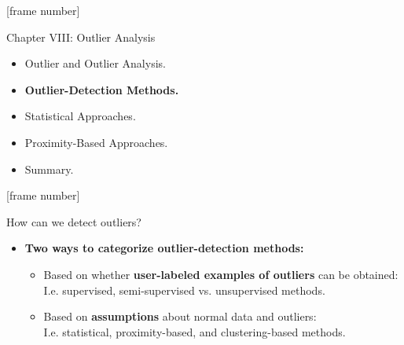 \documentclass[aspectratio=169,t,xcolor=dvipsnames]{beamer}
\begin{document}
{
[frame number]
\begin{frame}{Chapter VIII: Outlier Analysis}
    \begin{itemize}
        \item Outlier and Outlier Analysis.
        \item \textbf{Outlier-Detection Methods.}
        \item Statistical Approaches.
        \item Proximity-Based Approaches.
        \item Summary.
    \end{itemize}
\end{frame}
}

{
[frame number]
\begin{frame}{How can we detect outliers?}
    \begin{itemize}
        \item \textbf{Two ways to categorize outlier-detection methods:}
        \begin{itemize}
            \item Based on whether \textbf{\color{airforceblue}user-labeled examples of outliers} can be obtained: \\
            I.e. supervised, semi-supervised vs. unsupervised methods.
            \item Based on \textbf{\color{airforceblue}assumptions} about normal data and outliers: \\
            I.e. statistical, proximity-based, and clustering-based methods.
        \end{itemize}
    \end{itemize}
\end{frame}
}
\end{document}
